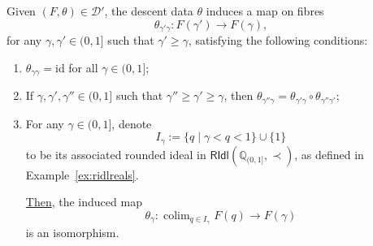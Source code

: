 \documentclass[a4paper, 11pt,reqno]{amsart}
\newcommand{\id}{\mathrm{id}}
\newcommand{\qint}{\mathbb{Q}_{(0,1]}}
\newcommand{\RIdl}{\mathsf{RIdl}}
\DeclareMathOperator*{\colim}{colim}
\begin{document}
\begin{claim}\label{claim:descent2upperreals} Given $(F,\theta)\in\mathcal{D}'$, the descent data $\theta$ induces a map on fibres %
	\[\theta_{\gamma'\gamma}\colon F(\gamma')\rightarrow F(\gamma),\]
	for any $\gamma,\gamma'\in (0,1]$ such that $\gamma'\geq \gamma$, satisfying the following conditions:
	\begin{enumerate}[label=(\roman*)] 	
		\item $\theta_{\gamma\gamma}=\id$ for all $\gamma\in(0,1]$;
		\item If $\gamma,\gamma',\gamma''\in (0,1]$ such that $\gamma''\geq \gamma'\geq \gamma$, then $\theta_{\gamma''\gamma}=\theta_{\gamma'\gamma}\circ\theta_{\gamma''\gamma'}$;
		\item For any $\gamma\in(0,1]$, denote 
		\[I_\gamma:=\{q\mid \gamma<q<1\}\cup\{1\}\]
		to be its associated rounded ideal in $\RIdl(\qint,\prec)$, as defined in Example~\ref{ex:ridlreals}. 
		
		\noindent \underline{Then}, the induced map \[\theta_{\gamma}\colon\displaystyle\colim_{q\in I_\gamma}F(q)\rightarrow F(\gamma)\] 
		is an isomorphism.
	\end{enumerate}
\end{claim}
\end{document}
